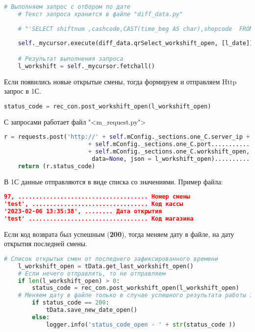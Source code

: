 \begin{itemize}
\begin{lstlisting}[language=Python, caption=Смены из БД]
	# Выполняем запрос с отбором по дате
	# Текст запроса хранится в файле "diff_data.py"
	
	# "'SELECT shiftnum ,cashcode,CAST(time_beg AS char),shopcode  FROM workshift WHERE time_end IS NULL AND time_beg >%s  '"
	
	self._mycursor.execute(diff_data.qrSelect_workshift_open, [l_date])

	# Результат выполнения запроса
	l_workshift = self._mycursor.fetchall()
		\end{lstlisting}


 Если появились новые открытые смены, тогда формируем и отправляем Http запрос в 1С. 
\newline
\begin{lstlisting}[language=Python, caption=Http-запрос]
	status_code = rec_con.post_workshift_open(l_workshift_open)
\end{lstlisting}
С запросами работает файл "<m\_request.py"> 
\newline
\begin{lstlisting}[language=Python, caption=Текст Http-запроса]
	r = requests.post('http://' + self.mConfig._sections.one_C.server_ip + ':'..... IP адрес 
						+ self.mConfig._sections.one_C.port........................................Port
						+ self.mConfig._sections.one_C.workshift_open,.................... Процедура
						 data=None, json = l_workshift_open)................................... Данные смен ККМ
	return (r.status_code)
\end{lstlisting} 
 
В 1С данные отправляются в виде списка со значениями. Пример файла:

\begin{lstlisting}[language=json,firstnumber=1, caption= Формат файла открытых смен]
97, ..................................... Номер смены
'test', ................................. Код кассы
'2023-02-06 13:35:38', ........ Дата открытия
'test' .................................. Код магазина
\end{lstlisting}
 
\newpage 
 
Если код возврата был успешным (\textbf{200}), тогда меняем дату в файле, на дату открытия последней смены.
\newline

	\begin{lstlisting}[language=Python, caption=Обработка результата]
 # Список открытых смен от последнего зафиксированного времени
	l_workshift_open = tData.get_last_workshift_open()
	# Если нечего отправлять, то не отправляем
	if len(l_workshift_open) > 0:
		status_code = rec_con.post_workshift_open(l_workshift_open)
	# Меняем дату в файле только в случае успешного результата работы 1C
		if status_code == 200:
			tData.save_new_date_open()
		else:
			logger.info('status_code_open - ' + str(status_code ))
	\end{lstlisting}




\end{itemize}
